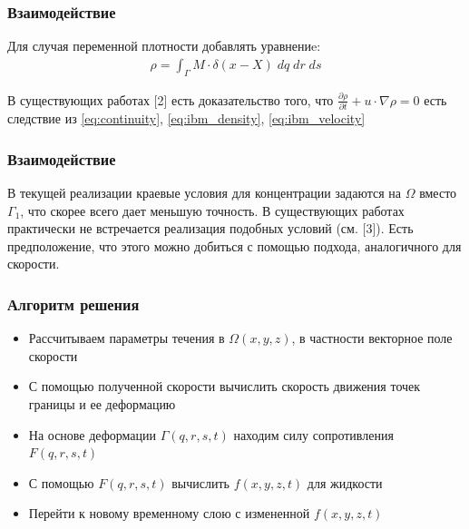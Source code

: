 \documentclass[14pt]{beamer}
\begin{document}
\begin{frame}
\frametitle{Взаимодействие}
Для случая переменной плотности добавлять уравнениe:
\begin{gather}
    \label{eq:ibm_density}
    \rho = \int_{\Gamma} M \cdot \delta (x - X)\; dq\; dr\; ds
\end{gather}

В существующих работах [2] есть доказательство того, что $\frac{\partial \rho}{\partial t} + u \cdot \nabla \rho = 0$ есть следствие из \eqref{eq:continuity}, \eqref{eq:ibm_density}, \eqref{eq:ibm_velocity}

\end{frame}

\begin{frame}
\frametitle{Взаимодействие}
В текущей реализации краевые условия для концентрации задаются на $\Omega$ вместо $\Gamma_1$, что скорее всего дает меньшую точность. В существующих работах практически не встречается реализация подобных условий (см. [3]). Есть предположение, что этого можно добиться с помощью подхода, аналогичного для скорости.
\end{frame}

\begin{frame}
\frametitle{Алгоритм решения}
    \begin{itemize}
        \item \alert<+>{Рассчитываем параметры течения в $\Omega(x, y, z)$, в частности векторное поле скорости}
        \item \alert<+>{С помощью полученной скорости вычислить скорость движения точек границы и ее деформацию}
        \item \alert<+>{На основе деформации $\Gamma(q, r, s, t)$ находим силу сопротивления $F(q, r, s, t)$}
        \item \alert<+>{С помощью $F(q, r, s, t)$ вычислить $f(x, y, z, t)$ для жидкости}
        \item \alert<+>{Перейти к новому временному слою с измененной $f(x, y, z, t)$}
    \end{itemize}
\end{frame}
\end{document}
